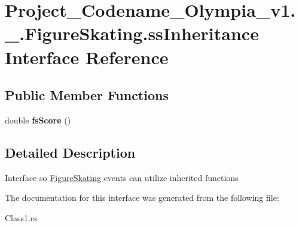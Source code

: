 \hypertarget{interfaceProject__Codename__Olympia__v1_1_1__0_1_1FigureSkating_1_1ssInheritance}{}\section{Project\+\_\+\+Codename\+\_\+\+Olympia\+\_\+v1.\+\_.\+Figure\+Skating.\+ss\+Inheritance Interface Reference}
\label{interfaceProject__Codename__Olympia__v1_1_1__0_1_1FigureSkating_1_1ssInheritance}
\subsection*{Public Member Functions}
\begin{DoxyCompactItemize}
\item 
\mbox{\label{interfaceProject__Codename__Olympia__v1_1_1__0_1_1FigureSkating_1_1ssInheritance_a746d4c0a4f9e66c645a2764a4df90451}} 
double {\bfseries fs\+Score} ()
\end{DoxyCompactItemize}


\subsection{Detailed Description}
Interface so \hyperlink{classProject__Codename__Olympia__v1_1_1__0_1_1FigureSkating}{Figure\+Skating} events can utilize inherited functions 

The documentation for this interface was generated from the following file\+:\begin{DoxyCompactItemize}
\item 
Class1.\+cs\end{DoxyCompactItemize}
